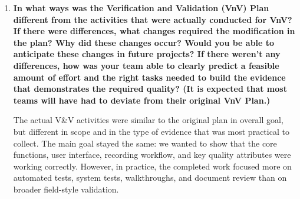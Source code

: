 \documentclass[12pt, titlepage]{article}
\begin{document}
\begin{enumerate}
        The parts of the report that were less directly based on client feedback were
        mostly the deeper engineering and software quality sections. For example, tests
        related to SSE thread safety, IPC buffer behaviour, API error responses, path
        traversal protection in the recording database, watchdog timing, formatter edge
        cases, and transcode process behaviour were mainly driven by software
        engineering concerns. These were included because they are important for
        correctness, robustness, maintainability, and safety, even if the client would
        not explicitly ask for them by name. The same is true for code coverage metrics
        and some of the traceability work. For example, the client may care that
        recording works correctly, but they would not usually ask specifically for
        branch coverage on rename and delete paths or for thread-safety checks on SSE
        listeners. These parts exist because they are important for demonstrating
        technical quality and satisfying course expectations, not because they came
        directly from stakeholder requests.

        In short, the user-facing and workflow-related parts of the report were
        influenced more by the client or proxy, while the lower-level software quality
        evidence came more from the team’s own engineering judgment and the structure
        required for the course deliverable.

  \item \textbf{In what ways was the Verification and Validation (VnV) Plan different from the
          activities that were actually conducted for VnV? If there were differences,
          what changes required the modification in the plan? Why did these changes
          occur? Would you be able to anticipate these changes in future projects? If
          there weren't any differences, how was your team able to clearly predict a
          feasible amount of effort and the right tasks needed to build the evidence that
          demonstrates the required quality? (It is expected that most teams will have
          had to deviate from their original VnV Plan.)}

        The actual V\&V activities were similar to the original plan in overall goal,
        but different in scope and in the type of evidence that was most practical to
        collect. The main goal stayed the same: we wanted to show that the core
        functions, user interface, recording workflow, and key quality attributes were
        working correctly. However, in practice, the completed work focused more on
        automated tests, system tests, walkthroughs, and document review than on
        broader field-style validation.


\end{enumerate}
\end{document}
